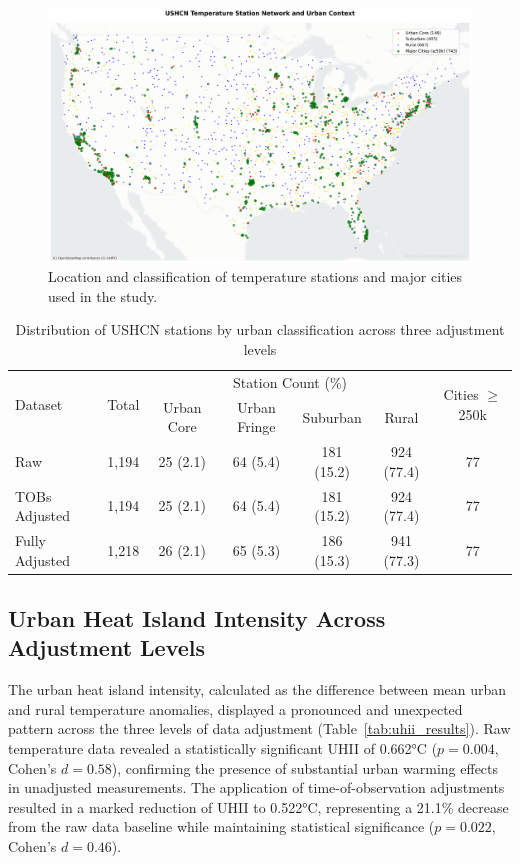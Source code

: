 \documentclass[11pt, a4paper]{article}
\begin{document}
\begin{figure}[htbp]
    \centering
    \includegraphics[width=1.0\textwidth]{figures/ushcn_academic_network_map_detailed.png}
    \caption{Location and classification of temperature stations and major cities used in the study.}
    \label{fig:station_map}
\end{figure}

\begin{table}[htbp]
\centering
\caption{Distribution of USHCN stations by urban classification across three adjustment levels}
\label{tab:station_distribution}
\begin{tabular}{lcccccc}
\hline
\multirow{2}{*}{Dataset} & \multirow{2}{*}{Total} & \multicolumn{4}{c}{Station Count (\%)} & \multirow{2}{*}{Cities $\geq$250k} \\
\cline{3-6}
 & & Urban Core & Urban Fringe & Suburban & Rural & \\
\hline
Raw & 1,194 & 25 (2.1) & 64 (5.4) & 181 (15.2) & 924 (77.4) & 77 \\
TOBs Adjusted & 1,194 & 25 (2.1) & 64 (5.4) & 181 (15.2) & 924 (77.4) & 77 \\
Fully Adjusted & 1,218 & 26 (2.1) & 65 (5.3) & 186 (15.3) & 941 (77.3) & 77 \\
\hline
\end{tabular}
\end{table}

\subsection{Urban Heat Island Intensity Across Adjustment Levels}

The urban heat island intensity, calculated as the difference between mean urban and rural temperature anomalies, displayed a pronounced and unexpected pattern across the three levels of data adjustment (Table~\ref{tab:uhii_results}). Raw temperature data revealed a statistically significant UHII of 0.662°C ($p = 0.004$, Cohen's $d = 0.58$), confirming the presence of substantial urban warming effects in unadjusted measurements. The application of time-of-observation adjustments resulted in a marked reduction of UHII to 0.522°C, representing a 21.1\% decrease from the raw data baseline while maintaining statistical significance ($p = 0.022$, Cohen's $d = 0.46$).
\end{document}
